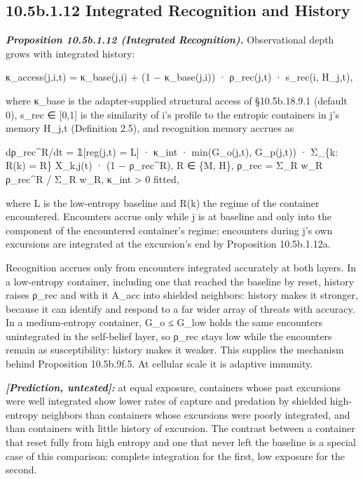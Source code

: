 \documentclass[
]{article}
\begin{document}
\hypertarget{b.1.12-integrated-recognition-and-history}{%
\subsection{10.5b.1.12 Integrated Recognition and
History}\label{b.1.12-integrated-recognition-and-history}}

\emph{\textbf{Proposition 10.5b.1.12 (Integrated Recognition).}}
Observational depth grows with integrated history:

κ\_access(j,i,t) = κ\_base(j,i) + (1 − κ\_base(j,i)) · ρ\_rec(j,t) ·
s\_rec(i, H\_j,t),

where κ\_base is the adapter-supplied structural access of §10.5b.18.9.1
(default 0), s\_rec ∈ {[}0,1{]} is the similarity of i's profile to the
entropic containers in j's memory H\_j,t (Definition 2.5), and
recognition memory accrues as

dρ\_rec\^{}R/dt = 𝟙{[}reg(j,t) = L{]} · κ\_int · min(G\_o(j,t),
G\_p(j,t)) · Σ\_\{k: R(k) = R\} X\_k,j(t) · (1 − ρ\_rec\^{}R), R ∈ \{M,
H\}, ρ\_rec = Σ\_R w\_R ρ\_rec\^{}R / Σ\_R w\_R, κ\_int \textgreater{} 0
fitted,

where L is the low-entropy baseline and R(k) the regime of the container
encountered. Encounters accrue only while j is at baseline and only into
the component of the encountered container's regime; encounters during
j's own excursions are integrated at the excursion's end by Proposition
10.5b.1.12a.

Recognition accrues only from encounters integrated accurately at both
layers. In a low-entropy container, including one that reached the
baseline by reset, history raises ρ\_rec and with it A\_acc into
shielded neighbors: history makes it stronger, because it can identify
and respond to a far wider array of threats with accuracy. In a
medium-entropy container, G\_o ≤ G\_low holds the same encounters
unintegrated in the self-belief layer, so ρ\_rec stays low while the
encounters remain as susceptibility: history makes it weaker. This
supplies the mechanism behind Proposition 10.5b.9f.5. At cellular scale
it is adaptive immunity.

\emph{\textbf{{[}Prediction, untested{]}:}} at equal exposure,
containers whose past excursions were well integrated show lower rates
of capture and predation by shielded high-entropy neighbors than
containers whose excursions were poorly integrated, and than containers
with little history of excursion. The contrast between a container that
reset fully from high entropy and one that never left the baseline is a
special case of this comparison: complete integration for the first, low
exposure for the second.
\end{document}
